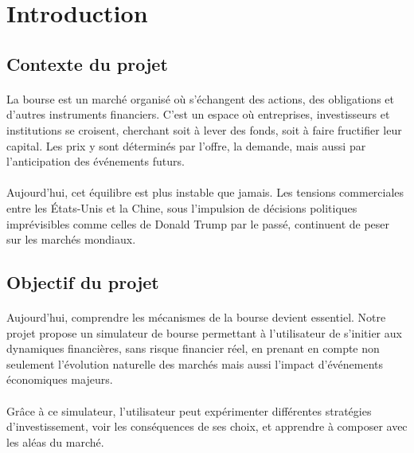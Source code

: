 \newpage
\section{Introduction}
\label{sec:introduction}

\subsection{Contexte du projet}

\paragraph{} La bourse est un marché organisé où s’échangent des actions, des obligations et d’autres instruments financiers. C’est un espace où entreprises, investisseurs et institutions se croisent, cherchant soit à lever des fonds, soit à faire fructifier leur capital. Les prix y sont déterminés par l'offre, la demande, mais aussi par l’anticipation des événements futurs.

\paragraph{} Aujourd’hui, cet équilibre est plus instable que jamais. Les tensions commerciales entre les États-Unis et la Chine, sous l’impulsion de décisions politiques imprévisibles comme celles de Donald Trump par le passé, continuent de peser sur les marchés mondiaux. 


\subsection{Objectif du projet}

\paragraph{} Aujourd'hui, comprendre les mécanismes de la bourse devient essentiel.
Notre projet propose un simulateur de bourse permettant à l’utilisateur de s'initier aux dynamiques financières, sans risque financier réel, en prenant en compte non seulement l'évolution naturelle des marchés mais aussi l'impact d’événements économiques majeurs.
\paragraph{} Grâce à ce simulateur, l’utilisateur peut expérimenter différentes stratégies d’investissement, voir les conséquences de ses choix, et apprendre à composer avec les aléas du marché.
